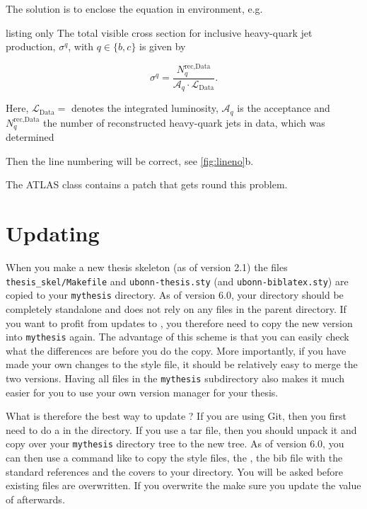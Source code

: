 The solution is to enclose the equation in  environment, e.g.
\begin{tcblisting}{listing only}
The total visible cross section for inclusive heavy-quark jet
production, \(\sigma^{q}\), with \(q\in\{b,c\}\) is given by
\begin{linenomath}
\begin{equation*}
  \sigma^{q} = \frac{N_{q}^{\text{rec,Data}}}%
    {\mathcal{A}_{q}\cdot\mathcal{L}_{\text{Data}}}.
\end{equation*}
\end{linenomath}
Here, \(\mathcal{L}_{\text{Data}}=\) denotes the integrated luminosity,
\(\mathcal{A}_{q}\) is the acceptance and \(N_{q}^{\text{rec,Data}}\) the
number of reconstructed heavy-quark jets in data, which was determined
\end{tcblisting}
\noindent
Then the line numbering will be correct, see \cref{fig:lineno}b.

The ATLAS  class contains a patch that gets round this problem.


\section{Updating }%
\label{sec:tips:update}

When you make a new thesis skeleton (as of version 2.1) the files
\texttt{thesis\_skel/Makefile} and \texttt{ubonn-thesis.sty}
(and \texttt{ubonn-biblatex.sty}) are copied
to your \texttt{mythesis} directory.
As of version 6.0, your  directory should be completely standalone
and does not rely on any files in the parent directory.
If you want to profit from updates to ,
you therefore need to copy the new version into \texttt{mythesis} again.
The advantage of this scheme is
that you can easily check what the differences are before you do the
copy. More importantly, if you have made your own changes to the style
file, it should be relatively easy to merge the two versions. Having
all files in the \texttt{mythesis} subdirectory also makes it much easier
for you to use your own version manager for your thesis.

What is therefore the best way to update ?
If you are using Git, then you first need to do a 
in the  directory.
If you use a tar file, then you should unpack it and copy over your
\texttt{mythesis} directory tree to the new  tree.
As of version 6.0, you can then use a command like
 to copy the style files,
the , the bib file with the standard references and the covers to your
 directory.
You will be asked before existing files are overwritten.
If you overwrite the  make sure you update the value of  afterwards.

